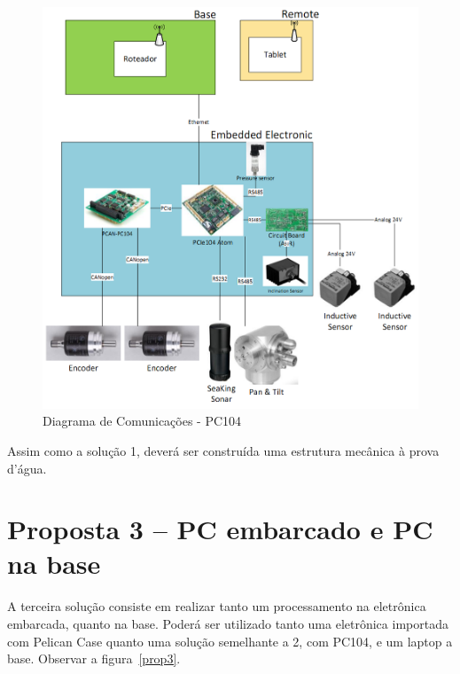 \begin{figure}[H]
    \centering
    \includegraphics[width=1\columnwidth]{figs/eletronica/4.png}
    \caption{Diagrama de Comunicações - PC104}
    \label{pc104}
\end{figure} 
 
Assim como a solução 1, deverá ser construída uma estrutura mecânica à prova d’água.

\section{Proposta 3 – PC embarcado e PC na base}

A terceira solução consiste em realizar tanto um processamento na eletrônica
embarcada, quanto na base. Poderá ser utilizado tanto uma eletrônica importada
com Pelican Case quanto uma solução semelhante a 2, com PC104, e um laptop a
base. Observar a figura~\ref{prop3}.


